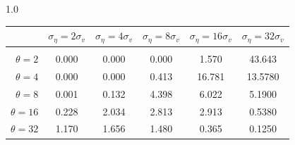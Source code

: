 \documentclass[12pt]{article}
\begin{document}
\begin{table}[h!]
\vspace{10pt}
\begin{subtable}{1.0\textwidth}
    \centering
\begin{tabular}{rccccc}
\hline  
            & \multicolumn{1}{l}{$\sigma_{\eta} =2\sigma_{v}$} & \multicolumn{1}{l}{$\sigma_{\eta} =4\sigma_{v}$} & \multicolumn{1}{l}{$\sigma_{\eta} =8\sigma_{v}$} & \multicolumn{1}{l}{$\sigma_{\eta} =16\sigma_{v}$} & \multicolumn{1}{l}{$\sigma_{\eta} =32\sigma_{v}$} \\ \hline  \vspace{-3mm} \\        
$\theta=2$  & 0.000                                             & 0.000                                             & 0.000                                             & 1.570                                              & \multicolumn{1}{c|}{43.643}   \\ \hline
$\theta=4$  & 0.000                                             & 0.000                                             & 0.413                                             & 16.781                                             & 13.5780                       \\ \hline
$\theta=8$  & 0.001                                             & 0.132                                             & 4.398                                             & 6.022                                              & 5.1900                        \\ \hline
$\theta=16$ & 0.228                                             & 2.034                                             & 2.813                                             & 2.913                                              & 0.5380                        \\ \hline
$\theta=32$ & 1.170                                             & 1.656                                             & 1.480                                             & 0.365                                              & 0.1250                        \\ \hline
\end{tabular}
\end{subtable}


\end{table}
\end{document}
